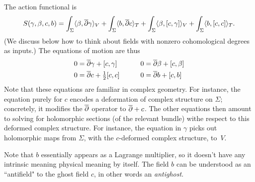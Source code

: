 The action functional is
\begin{equation}\label{bosaction}
S(\gamma,\beta,c,b) = 
\int_\Sigma \langle \beta, \overline{\partial} \gamma \rangle_V 
+ \int_\Sigma \langle b, \overline{\partial} c \rangle_T 
+ \int_\Sigma \langle \beta, [c,\gamma] \rangle_V 
+ \int_\Sigma \langle b, [c,c] \rangle_T.
\end{equation}
(We discuss below how to think about fields with nonzero cohomological degrees as inputs.)
The equations of motion are thus
\begin{alignat*}{2}
0 &= \overline{\partial} \gamma + [c,\gamma] & \quad\quad  0 &= \overline{\partial} \beta + [c,\beta] \\
0  &= \overline{\partial} c + \tfrac{1}{2} [c,c] & \quad\quad  0 &= \overline{\partial} b + [c,b] 
\end{alignat*}
Note that these equations are familiar in complex geometry.
For instance, the equation purely for $c$ encodes a deformation of complex structure on $\Sigma$; concretely, it modifies the $\overline{\partial}$ operator to $\overline{\partial} + c$.
The other equations then amount to solving for holomorphic sections (of the relevant bundle) withe respect to this deformed complex structure.
For instance, the equation in $\gamma$ picks out holomorphic maps from $\Sigma$,
with the $c$-deformed complex structure, to~$V$.


Note that $b$ essentially appears as a Lagrange multiplier, so it doesn't have any intrinsic meaning physical meaning by itself. 
The field $b$ can be understood as an ``antifield" to the ghost field $c$, in other words an {\em antighost}. 



